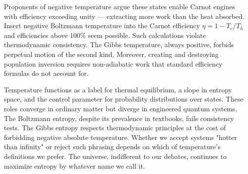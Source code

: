 Proponents of negative temperature argue these states enable Carnot engines with efficiency exceeding unity — extracting more work than the heat absorbed. Insert negative Boltzmann temperature into the Carnot efficiency $\eta = 1 - T_c/T_h$ and efficiencies above 100\% seem possible. Such calculations violate thermodynamic consistency. The Gibbs temperature, always positive, forbids perpetual motion of the second kind. Moreover, creating and destroying population inversion requires non-adiabatic work that standard efficiency formulas do not account for.

Temperature functions as a label for thermal equilibrium, a slope in entropy space, and the control parameter for probability distributions over states. These roles converge in ordinary matter but diverge in engineered quantum systems. The Boltzmann entropy, despite its prevalence in textbooks, fails consistency tests. The Gibbs entropy respects thermodynamic principles at the cost of forbidding negative absolute temperature. Whether we accept systems "hotter than infinity" or reject such phrasing depends on which of temperature's definitions we prefer. The universe, indifferent to our debates, continues to maximize entropy by whatever name we call it.
